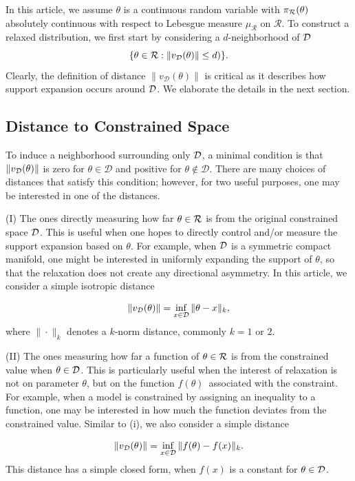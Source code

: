 \documentclass[10pt,fleqn]{article}
\DeclareMathOperator{\1}{\mathbbm{1}} \DeclareMathOperator{\bigO}{\mc O}
\begin{document}
In this article, we assume $\theta$ is a continuous random variable with $\pi_{\mathcal{R}}(\theta)$
absolutely continuous with respect to Lebesgue measure $\mu_\mathcal{R}$ on $\mathcal{R}$. To construct a relaxed distribution, we first start by considering a $d$-neighborhood of ${\mathcal{D}}$
$$\{\theta\in \mathcal{R}: \|v_\mathcal{D}(\theta)\| \le d) \}.$$
Clearly, the definition of distance $\|v_\mathcal{D}(\theta)\|$ is critical as it describes how support expansion occurs around $\mathcal{D}$. We elaborate the details in the next section.

\subsection{Distance to Constrained Space}

To induce a neighborhood surrounding only $\mathcal{D}$, a minimal condition is that $\|v_{\mathcal{D}}(\theta)\|$ is zero for $\theta \in \mathcal{D}$ and positive for $\theta\not\in\mathcal{D}$. There are many choices of distances that satisfy this condition; however, for two useful purposes, one may be interested in one of the distances.

(I) The ones directly measuring how far $\theta \in \mathcal{R}$ is from the original constrained space $\mathcal{D}$. This is useful when one hopes to directly control and/or measure the support expansion based on $\theta$. For example, when $\mathcal{D}$ is a symmetric compact manifold, one might be interested in uniformly expanding the support of $\theta$, so that the relaxation does not create any directional asymmetry. In this article, we consider a simple isotropic distance

\begin{eqnarray}
\|v_{\mathcal{D}}(\theta)\| = \inf_{x\in\mathcal{D}} \|\theta-x\|_k,
\end{eqnarray}
where $\|\cdot\|_k$ denotes a $k$-norm distance, commonly $k=1$ or $2$.

(II) The ones measuring how far a function of $\theta \in \mathcal{R}$ is from the constrained value when $\theta\in \mathcal{D}$. This is particularly useful when the interest of relaxation is not on parameter $\theta$, but on the function $f(\theta)$\ associated with the constraint. For example, when a model is constrained by assigning an inequality to a function, one may be interested in how much the function deviates from the constrained value. Similar to (i), we also consider a simple distance

\begin{eqnarray}
\|v_{\mathcal{D}}(\theta)\| = \inf_{x\in\mathcal{D}} \|f(\theta)-f(x)\|_k.
\end{eqnarray}
This distance has a simple closed form, when $f(x)$ is a constant for $\theta\in \mathcal{D}$.
\end{document}
